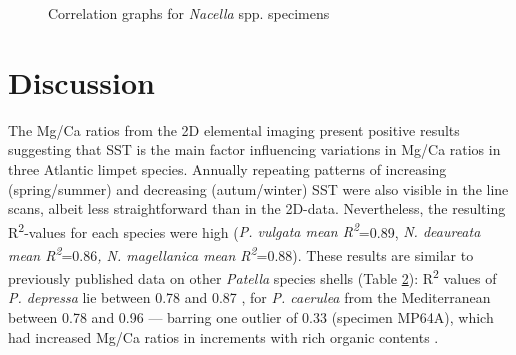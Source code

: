 \documentclass[
  authoryear,
  preprint,
  3p]{elsarticle}
\begin{document}
\begin{figure}


\caption{\label{fig-Nac_Corr}Correlation graphs for \emph{Nacella} spp.
specimens}

\end{figure}%

\section{Discussion}\label{Discussion}

The Mg/Ca ratios from the 2D elemental imaging present positive results
suggesting that SST is the main factor influencing variations in Mg/Ca
ratios in three Atlantic limpet species. Annually repeating patterns of
increasing (spring/summer) and decreasing (autum/winter) SST were also
visible in the line scans, albeit less straightforward than in the
2D-data. Nevertheless, the resulting R\textsuperscript{2}-values for
each species were high (\emph{P. vulgata mean
R\textsuperscript{2}}=0.89, \emph{N. deaureata mean
R\textsuperscript{2}}=0.86\emph{, N. magellanica mean
R\textsuperscript{2}}=0.88). These results are similar to previously
published data on other \emph{Patella} species shells (Table
\hyperref[Table_2]{2}): R\textsuperscript{2} values of \emph{P.
depressa} lie between 0.78 and 0.87 \citep{Garcia-Escarzaga2021-ij}, for
\emph{P. caerulea} from the Mediterranean between 0.78 and 0.96 ---
barring one outlier of 0.33 (specimen MP64A), which had increased Mg/Ca
ratios in increments with rich organic contents \citep{Hausmann2019-fi}.

\label{Table_2}
\fontsize{8pt}{8pt}\selectfont
\end{document}
